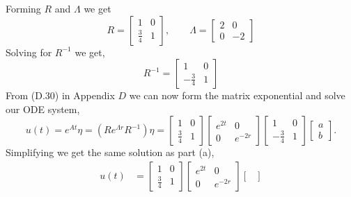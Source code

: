 \documentclass[12pt]{article}
\makeatletter
\theoremstyle{homework}
\newenvironment{exercise}[1]
{\def\@currentlabel{#1}\exercisecore}
{\endexercisecore}
\makeatother
\begin{document}
\begin{exercise}{Problem P25}
\begin{enumerate}
    Forming $R$ and $\Lambda$ we get
    \begin{equation*}
      R = \begin{bmatrix}
        1 & 0\\
        \frac{3}{4} & 1
      \end{bmatrix},\qquad
      \Lambda = \begin{bmatrix}
        2 & 0\\
        0 & -2
      \end{bmatrix}
    \end{equation*}
    Solving for $R^{-1}$ we get, 
    \begin{equation*}
      R^{-1} = \begin{bmatrix}
        1 & 0\\
        -\frac{3}{4} & 1
      \end{bmatrix}
    \end{equation*} 
    From (D.30) in Appendix $D$ we can now form the matrix exponential and 
    solve our ODE system,
    \begin{equation*}
      u(t) = e^{At}\eta = (R e^{\Lambda r} R^{-1}) \eta = 
      \begin{bmatrix}
        1 & 0\\
        \frac{3}{4} & 1
      \end{bmatrix}
      \begin{bmatrix}
        e^{2t} & 0\\
        0 & e^{-2r}
      \end{bmatrix}
      \begin{bmatrix}
        1 & 0\\
        -\frac{3}{4} & 1
      \end{bmatrix}
      \begin{bmatrix}
        a\\
        b
      \end{bmatrix}.
    \end{equation*}
    Simplifying we get the same solution as part (a), 
    \begin{align*}
      u(t) &= 
      \begin{bmatrix}
        1 & 0\\
        \frac{3}{4} & 1
      \end{bmatrix}
      \begin{bmatrix}
        e^{2t} & 0\\
        0 & e^{-2r}
      \end{bmatrix}
      \begin{bmatrix}

\end{bmatrix}
\end{align*}
\end{enumerate}
\end{exercise}
\end{document}
